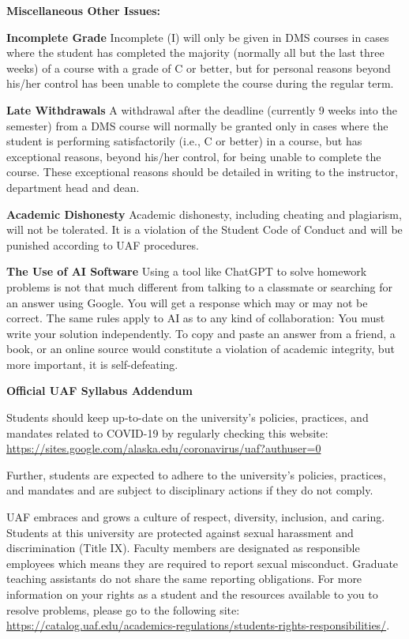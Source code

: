 \documentclass[12pt]{article}
\begin{document}
\newpage


\textbf{Miscellaneous Other Issues:}

\textbf{Incomplete Grade} 
Incomplete (I) will only be given in DMS courses in cases where the student has completed the majority (normally all but the last three weeks) of a course with a grade of C or better, but for personal reasons beyond his/her control has been unable to complete the course during the regular term. 

\textbf{Late Withdrawals} 
A withdrawal after the deadline (currently 9 weeks into the semester) from a DMS course will normally be granted only in cases where the student is performing satisfactorily (i.e., C or better) in a course, but has exceptional reasons, beyond his/her control, for being unable to complete the course. These exceptional reasons should be detailed in writing to the instructor, department head and dean.

\textbf{Academic Dishonesty}
Academic dishonesty, including cheating and plagiarism, will not
be tolerated.  It is a violation of the Student Code of Conduct
and will be punished according to UAF procedures.

\textbf{The Use of AI Software}
Using a tool like ChatGPT to solve homework problems is not that much different from talking to a classmate or searching for an answer using Google. You will get a response which may or may not be correct. The same rules apply to AI as to any kind of collaboration: You must write your solution independently. To copy and paste an answer from a friend, a book, or an online source would constitute a violation of academic integrity, but more important, it is self-defeating.

\begin{center}\textbf{\large{Official UAF Syllabus Addendum}}\end{center}

 Students should keep up-to-date on the university's policies, practices, and mandates related to COVID-19 by regularly checking this website: \url{https://sites.google.com/alaska.edu/coronavirus/uaf?authuser=0}

Further, students are expected to adhere to the university's policies, practices, and mandates and are subject to disciplinary actions if they do not comply.

 UAF embraces and grows a culture of respect, diversity, inclusion, and caring. Students at this university are protected against sexual harassment and discrimination (Title IX). Faculty members are designated as responsible employees which means they are required to report sexual misconduct. Graduate teaching assistants do not share the same reporting obligations. For more information on your rights as a student and the resources available to you to resolve problems, please go to the following site: \url{https://catalog.uaf.edu/academics-regulations/students-rights-responsibilities/}.
\end{document}
